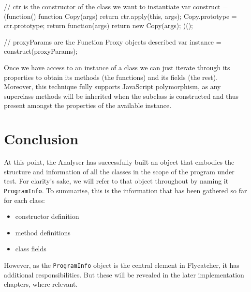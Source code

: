 \begin{code}[caption=Instantiating a \texttt{Function} object,label=instantiatingfn]
// ctr is the constructor of the class we want to instantiate
var construct = (function() {
    function Copy(args) {
        return ctr.apply(this, args);
    }
    Copy.prototype = ctr.prototype;
    return function(args) {
        return new Copy(args);
    }
})();

// proxyParams are the Function Proxy objects described
var instance = construct(proxyParams);
\end{code}

Once we have access to an instance of a class we can just iterate through its properties to obtain its methods (the functions) and its fields (the rest). Moreover, this technique fully supports JavaScript polymorphism, as any superclass methods will be inherited when the subclass is constructed and thus present amongst the properties of the available instance.

\section{Conclusion}
At this point, the \textsf{Analyser} has successfully built an object that embodies the structure and information of all the classes in the scope of the program under test. For clarity's sake, we will refer to that object throughout by naming it \texttt{ProgramInfo}. To summarise, this is the information that has been gathered so far for each class:

\begin{itemize}
   \item constructor definition \checkmark
   \item method definitions \checkmark
   \item class fields \checkmark
\end{itemize}

However, as the \texttt{ProgramInfo} object is the central element in \textsf{Flycatcher}, it has additional responsibilities. But these will be revealed in the later implementation chapters, where relevant.